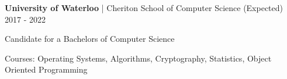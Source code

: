 


\begin{cventries}


\cventry
{\textbf{University of Waterloo} | Cheriton School of Computer Science}
{(Expected) 2017 - 2022}
{ %
\begin{cvitems}
\item {Candidate for a Bachelors of Computer Science}
\item {Courses: Operating Systems, Algorithms, Cryptography, Statistics, Object Oriented Programming}
\end{cvitems}
}


\end{cventries}